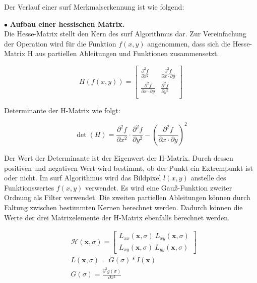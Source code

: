 Der Verlauf einer \gls{surf} Merkmalserkennung ist wie folgend:

$\bullet$ \textbf{Aufbau einer hessischen Matrix.}\\
Die Hesse-Matrix stellt den Kern des \gls{surf} Algorithmus dar. Zur Vereinfachung der Operation wird für die Funktion $f(x,y)$ angenommen, dass sich die Hesse-Matrix H aus partiellen Ableitungen und Funktionen zusammensetzt.

\begin{equation}
   H(f(x,y)) = \begin{bmatrix}
   \frac{\partial^{2}f}{\partial x^{2}} & \frac{\partial^{2}f}{\partial x \cdot \partial y} \\
   \frac{\partial^{2}f}{\partial x \cdot \partial y} & \frac{\partial^{2}f}{\partial y^{2}} \\   
   \end{bmatrix}
\end{equation}

 Determinante der H-Matrix wie folgt:
 
\begin{equation}
   \det(H) = \frac{\partial^{2}f}{\partial x^{2}} \cdot \frac{\partial^{2}f}{\partial y^{2}} - (\frac{\partial^{2}f}{\partial x \cdot \partial y})^2  
\end{equation}

Der Wert der Determinante ist der Eigenwert der H-Matrix. Durch dessen positiven und negativen Wert wird bestimmt, ob der Punkt ein Extrempunkt ist oder nicht. Im \gls{surf} Algorithmus wird das Bildpixel $l(x,y)$ anstelle des Funktionswertes $f(x,y)$ verwendet. Es wird eine Gauß-Funktion zweiter Ordnung als Filter verwendet. Die zweiten partiellen Ableitungen können durch Faltung zwischen bestimmten Kernen berechnet werden. Dadurch können die Werte der drei Matrixelemente der H-Matrix ebenfalls berechnet werden.

\begin{equation}
\begin{split}
   &\mathcal{H}(\textbf{x},\sigma) = \begin{bmatrix}
   L_{xx}(\textbf{x},\sigma)\ L_{xy}(\textbf{x},\sigma) \\
   L_{xy}(\textbf{x},\sigma)\ L_{yy}(\textbf{x},\sigma)
   \end{bmatrix} \\   
   &L(\textbf{x},\sigma) = G(\sigma)*I(\textbf{x}) \\  
   &G(\sigma) = \frac{\partial^{2}g(\sigma)}{\partial x^{2}}      
\end{split}
\end{equation}


